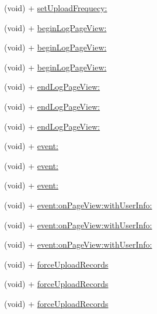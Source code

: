 \begin{DoxyCompactItemize}
\item 
(void) + \mbox{\hyperlink{interface_weibo_s_d_k_a6790cf45454697f2b846eb080a130ef2}{set\+Upload\+Frequecy\+:}}
\item 
(void) + \mbox{\hyperlink{interface_weibo_s_d_k_ae9b18093f71e740c51f254fb517e818d}{begin\+Log\+Page\+View\+:}}
\item 
(void) + \mbox{\hyperlink{interface_weibo_s_d_k_ae9b18093f71e740c51f254fb517e818d}{begin\+Log\+Page\+View\+:}}
\item 
(void) + \mbox{\hyperlink{interface_weibo_s_d_k_ae9b18093f71e740c51f254fb517e818d}{begin\+Log\+Page\+View\+:}}
\item 
(void) + \mbox{\hyperlink{interface_weibo_s_d_k_aa9460b8e4fd90f3b437207c55ef2c40e}{end\+Log\+Page\+View\+:}}
\item 
(void) + \mbox{\hyperlink{interface_weibo_s_d_k_aa9460b8e4fd90f3b437207c55ef2c40e}{end\+Log\+Page\+View\+:}}
\item 
(void) + \mbox{\hyperlink{interface_weibo_s_d_k_aa9460b8e4fd90f3b437207c55ef2c40e}{end\+Log\+Page\+View\+:}}
\item 
(void) + \mbox{\hyperlink{interface_weibo_s_d_k_af035b5557e6dd544e282689323d8c4aa}{event\+:}}
\item 
(void) + \mbox{\hyperlink{interface_weibo_s_d_k_af035b5557e6dd544e282689323d8c4aa}{event\+:}}
\item 
(void) + \mbox{\hyperlink{interface_weibo_s_d_k_af035b5557e6dd544e282689323d8c4aa}{event\+:}}
\item 
(void) + \mbox{\hyperlink{interface_weibo_s_d_k_a7c433640d9ed0d396166f2777a428277}{event\+:on\+Page\+View\+:with\+User\+Info\+:}}
\item 
(void) + \mbox{\hyperlink{interface_weibo_s_d_k_a7c433640d9ed0d396166f2777a428277}{event\+:on\+Page\+View\+:with\+User\+Info\+:}}
\item 
(void) + \mbox{\hyperlink{interface_weibo_s_d_k_a7c433640d9ed0d396166f2777a428277}{event\+:on\+Page\+View\+:with\+User\+Info\+:}}
\item 
(void) + \mbox{\hyperlink{interface_weibo_s_d_k_ab5d6291270ebed0084a505e009bc15a2}{force\+Upload\+Records}}
\item 
(void) + \mbox{\hyperlink{interface_weibo_s_d_k_ab5d6291270ebed0084a505e009bc15a2}{force\+Upload\+Records}}
\item 
(void) + \mbox{\hyperlink{interface_weibo_s_d_k_ab5d6291270ebed0084a505e009bc15a2}{force\+Upload\+Records}}
\end{DoxyCompactItemize}
